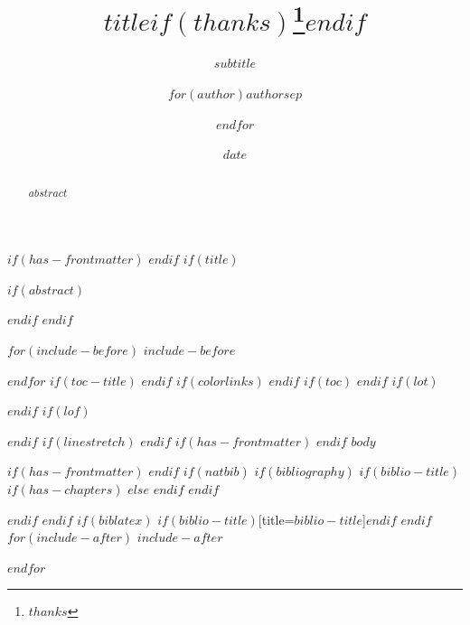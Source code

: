 \documentclass[
a4paper,
twoside
]{$documentclass$}
\title{$title$$if(thanks)$\thanks{$thanks$}$endif$}
\subtitle{$subtitle$}
\author{$for(author)$$author$$sep$ \and $endfor$}
\date{$date$}
\begin{document}
$if(has-frontmatter)$
\frontmatter
$endif$
$if(title)$
\maketitle
$if(abstract)$
\begin{abstract}
$abstract$
\end{abstract}
$endif$
$endif$

$for(include-before)$
$include-before$

$endfor$
$if(toc-title)$
\renewcommand*\contentsname{%
    $toc-title$%
    $if(toc-subtitle)$
    \newline\textmd{\small{$toc-subtitle$}}%
    $endif$%
}
$endif$
$if(colorlinks)$
\hypersetup{linkcolor=$if(toccolor)$$toccolor$$else$$endif$}
$endif$
$if(toc)$
{
\setcounter{tocdepth}{$toc-depth$}
\tableofcontents
}
$endif$
$if(lot)$
\listoftables
$endif$
$if(lof)$
\listoffigures
$endif$
$if(linestretch)$
$endif$
$if(has-frontmatter)$
\mainmatter
$endif$
$body$

$if(has-frontmatter)$
\backmatter
$endif$
$if(natbib)$
$if(bibliography)$
$if(biblio-title)$
$if(has-chapters)$
\renewcommand\bibname{$biblio-title$}
$else$
\renewcommand\refname{$biblio-title$}
$endif$
$endif$
  

$endif$
$endif$
$if(biblatex)$
\printbibliography$if(biblio-title)$[title=$biblio-title$]$endif$
$endif$
$for(include-after)$
$include-after$

$endfor$
\end{document}

